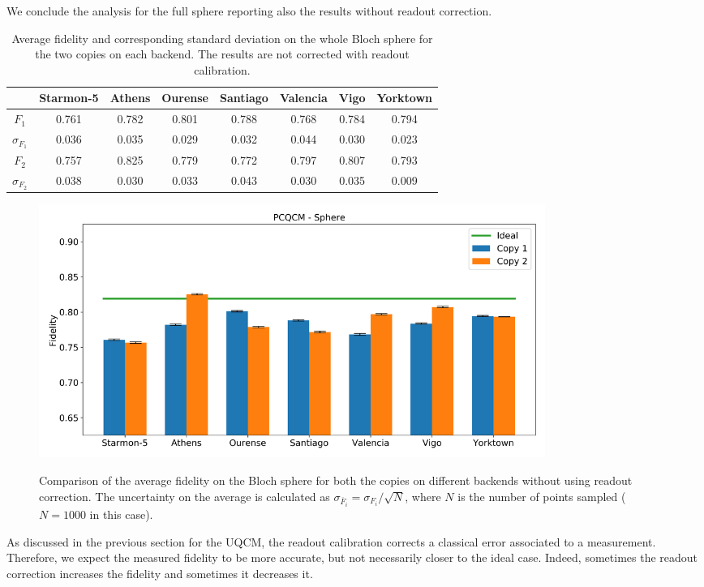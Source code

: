 We conclude the analysis for the full sphere reporting also the results without readout correction.
\begin{table}[H]
    \centering
    \begin{tabular}{|c|c|c|c|c|c|c|c|}
    \hline
    \textbf{} & \textbf{Starmon-5} & \textbf{Athens} & \textbf{Ourense} & \textbf{Santiago} & \textbf{Valencia} & \textbf{Vigo} & \textbf{Yorktown} \\ \hline
    $F_1$              & 0.761 & 0.782 & 0.801 & 0.788 & 0.768 & 0.784 & 0.794 \\ \hline
    $\sigma_{F_1}$     & 0.036 & 0.035 & 0.029 & 0.032 & 0.044 & 0.030 & 0.023 \\ \hline
    $F_2$              & 0.757 & 0.825 & 0.779 & 0.772 & 0.797 & 0.807 & 0.793 \\ \hline
    $\sigma_{F_2}$     & 0.038 & 0.030 & 0.033 & 0.043 & 0.030 & 0.035 & 0.009 \\ \hline
    \end{tabular}
    \caption{Average fidelity and corresponding standard deviation on the whole Bloch sphere for the two copies on each backend. The results are not corrected with readout calibration.}
    \label{tab:results_pcqcm_fullsphere_not_corrected}
\end{table}
\begin{figure}[H]
  \centering
          \includegraphics[width=0.8\textwidth]{Figures/PhaseCovariant/Histograms/histo_sphere.png}
      \label{fig:pc_histo_sphere_not_corrected}
      \caption{Comparison of the average fidelity on the Bloch sphere for both the copies on different backends without using readout correction. The uncertainty on the average is calculated as $\sigma_{\overline{F}_i}=\sigma_{F_i}/\sqrt{N}$, where $N$ is the number of points sampled ($N=1000$ in this case).}
\end{figure}
As discussed in the previous section for the UQCM, the readout calibration corrects a classical error associated to a measurement.
Therefore, we expect the measured fidelity to be more accurate, but not necessarily closer to the ideal case. 
Indeed, sometimes the readout correction increases the fidelity and sometimes it decreases it.

